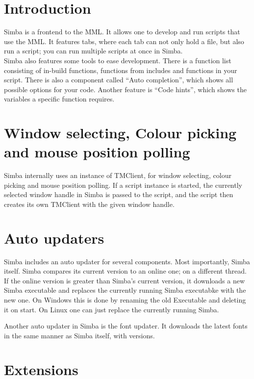 \documentclass[a4paper, 10pt]{report} %
\begin{document}
\section{Introduction}

Simba is a frontend to the MML. It allows one to develop and run scripts that 
use the MML. It features tabs, where each tab can not only hold a file, but also
run a script; you can run multiple scripts at once in Simba. \\

Simba also features some tools to ease development. There is a function list
consisting of in-build functions, functions from includes and functions in your
script. There is also a component called ``Auto completion'', which shows all
possible options for your code. Another feature is ``Code hints'', which shows
the variables a specific function requires.

\section{Window selecting, Colour picking and mouse position polling}
Simba internally uses an instance of TMClient, for window selecting, colour
picking and mouse position polling. If a script instance is started, the
currently selected window handle in Simba is passed to the script, and the script
then creates its own TMClient with the given window handle.

\section{Auto updaters}

Simba includes an auto updater for several components. Most importantly, Simba
itself. Simba compares its current version to an online one; on a different
thread. If the online version is greater than Simba's current version, it
downloads a new Simba executable and replaces the currently running Simba
executabke with the new one. On Windows this is done by renaming the old
Executable and deleting it on start. On Linux one can just replace the currently
running Simba.

Another auto updater in Simba is the font updater. It downloads the latest fonts
in the same manner as Simba itself, with versions.

\section{Extensions}
\end{document}
